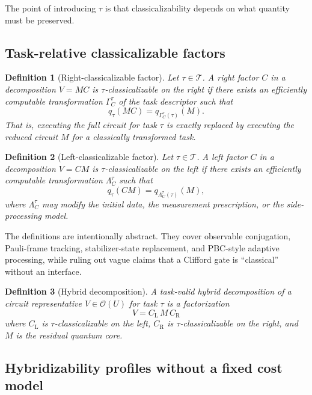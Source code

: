 \documentclass[11pt]{article}
\newtheorem{definition}{Definition}
\theoremstyle{remark}
\newcommand{\orbit}{\mathcal{O}}
\newcommand{\Task}{\mathcal{T}}
\begin{document}
The point of introducing $\tau$ is that classicalizability depends on what quantity must be preserved.

\subsection{Task-relative classicalizable factors}

\begin{definition}[Right-classicalizable factor]
Let $\tau \in \Task$. A right factor $C$ in a decomposition $V = M C$ is \emph{$\tau$-classicalizable on the right} if there exists an efficiently computable transformation $\Gamma_{C}^{\tau}$ of the task descriptor such that
\[
q_{\tau}(M C) = q_{\Gamma_{C}^{\tau}(\tau)}(M).
\]
That is, executing the full circuit for task $\tau$ is exactly replaced by executing the reduced circuit $M$ for a classically transformed task.
\end{definition}

\begin{definition}[Left-classicalizable factor]
Let $\tau \in \Task$. A left factor $C$ in a decomposition $V = C M$ is \emph{$\tau$-classicalizable on the left} if there exists an efficiently computable transformation $\Lambda_{C}^{\tau}$ such that
\[
q_{\tau}(C M) = q_{\Lambda_{C}^{\tau}(\tau)}(M),
\]
where $\Lambda_{C}^{\tau}$ may modify the initial data, the measurement prescription, or the side-processing model.
\end{definition}

The definitions are intentionally abstract. They cover observable conjugation, Pauli-frame tracking, stabilizer-state replacement, and PBC-style adaptive processing, while ruling out vague claims that a Clifford gate is ``classical'' without an interface.

\begin{definition}[Hybrid decomposition]
A \emph{task-valid hybrid decomposition} of a circuit representative $V \in \orbit(U)$ for task $\tau$ is a factorization
\[
V = C_{\mathrm{L}} \, M \, C_{\mathrm{R}}
\]
where $C_{\mathrm{L}}$ is $\tau$-classicalizable on the left, $C_{\mathrm{R}}$ is $\tau$-classicalizable on the right, and $M$ is the residual quantum core.
\end{definition}

\subsection{Hybridizability profiles without a fixed cost model}
\end{document}
